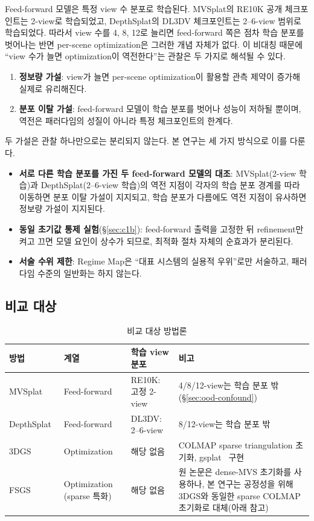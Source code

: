 Feed-forward 모델은 특정 view 수 분포로 학습된다. MVSplat의 RE10K 공개 체크포인트는 2-view로 학습되었고, DepthSplat의 DL3DV 체크포인트는 2--6-view 범위로 학습되었다. 따라서 view 수를 4, 8, 12로 늘리면 feed-forward 쪽은 점차 학습 분포를 벗어나는 반면 per-scene optimization은 그러한 개념 자체가 없다. 이 비대칭 때문에 ``view 수가 늘면 optimization이 역전한다''는 관찰은 두 가지로 해석될 수 있다.

\begin{enumerate}
  \item \textbf{정보량 가설}: view가 늘면 per-scene optimization이 활용할 관측 제약이 증가해 실제로 유리해진다.
  \item \textbf{분포 이탈 가설}: feed-forward 모델이 학습 분포를 벗어나 성능이 저하될 뿐이며, 역전은 패러다임의 성질이 아니라 특정 체크포인트의 한계다.
\end{enumerate}

두 가설은 관찰 하나만으로는 분리되지 않는다. 본 연구는 세 가지 방식으로 이를 다룬다.

\begin{itemize}
  \item \textbf{서로 다른 학습 분포를 가진 두 feed-forward 모델의 대조}: MVSplat(2-view 학습)과 DepthSplat(2--6-view 학습)의 역전 지점이 각자의 학습 분포 경계를 따라 이동하면 분포 이탈 가설이 지지되고, 학습 분포가 다름에도 역전 지점이 유사하면 정보량 가설이 지지된다.
  \item \textbf{동일 초기값 통제 실험}(\S\ref{sec:c1b}): feed-forward 출력을 고정한 뒤 refinement만 켜고 끄면 모델 요인이 상수가 되므로, 최적화 절차 자체의 순효과가 분리된다.
  \item \textbf{서술 수위 제한}: Regime Map은 ``대표 시스템의 실용적 우위''로만 서술하고, 패러다임 수준의 일반화는 하지 않는다.
\end{itemize}

\subsection{비교 대상}

\begin{table}[t]
\centering
\caption{비교 대상 방법론}
\label{tab:methods}
\small
\begin{tabular}{@{}l l l L{5.8cm}@{}}
\toprule
방법 & 계열 & 학습 view 분포 & 비고 \\
\midrule
MVSplat~\cite{chen2024mvsplat} & Feed-forward & RE10K: 고정 2-view & 4/8/12-view는 학습 분포 밖(\S\ref{sec:ood-confound}) \\
DepthSplat~\cite{xu2025depthsplat} & Feed-forward & DL3DV: 2--6-view & 8/12-view는 학습 분포 밖 \\
3DGS~\cite{kerbl20233d} & Optimization & 해당 없음 & COLMAP sparse triangulation 초기화, gsplat~\cite{ye2024gsplat} 구현 \\
FSGS~\cite{zhu2024fsgs} & Optimization (sparse 특화) & 해당 없음 & 원 논문은 dense-MVS 초기화를 사용하나, 본 연구는 공정성을 위해 3DGS와 동일한 sparse COLMAP 초기화로 대체(아래 참고) \\
\bottomrule
\end{tabular}
\end{table}


